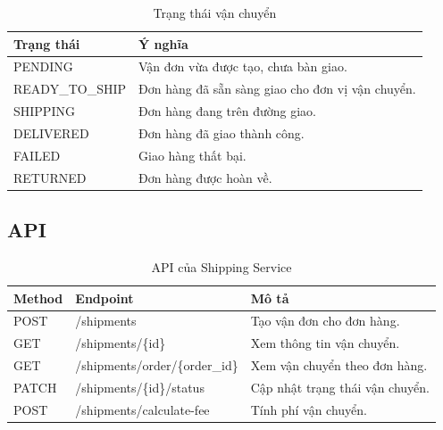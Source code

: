 \documentclass[../main.tex]{subfiles}
\begin{document}
\begin{table}[H]
    \centering
    \caption{Trạng thái vận chuyển}
    \label{tab:chapter2-shipping-status}
    \begin{tabular}{|p{}|p{}|}
        \hline
        \rowcolor{primary!35}
        \textbf{Trạng thái} & \textbf{Ý nghĩa} \\
        \hline
        PENDING & Vận đơn vừa được tạo, chưa bàn giao. \\
        \hline
        READY\_TO\_SHIP & Đơn hàng đã sẵn sàng giao cho đơn vị vận chuyển. \\
        \hline
        SHIPPING & Đơn hàng đang trên đường giao. \\
        \hline
        DELIVERED & Đơn hàng đã giao thành công. \\
        \hline
        FAILED & Giao hàng thất bại. \\
        \hline
        RETURNED & Đơn hàng được hoàn về. \\
        \hline
    \end{tabular}
\end{table}

\subsection{API}
\label{subsection:2.8.3}

\begin{table}[H]
    \centering
    \caption{API của Shipping Service}
    \label{tab:chapter2-shipping-api}
    \begin{tabular}{|p{}|p{}|p{}|}
        \hline
        \rowcolor{primary!35}
        \textbf{Method} & \textbf{Endpoint} & \textbf{Mô tả} \\
        \hline
        POST & /shipments & Tạo vận đơn cho đơn hàng. \\
        \hline
        GET & /shipments/\{id\} & Xem thông tin vận chuyển. \\
        \hline
        GET & /shipments/order/\{order\_id\} & Xem vận chuyển theo đơn hàng. \\
        \hline
        PATCH & /shipments/\{id\}/status & Cập nhật trạng thái vận chuyển. \\
        \hline
        POST & /shipments/calculate-fee & Tính phí vận chuyển. \\
        \hline
    \end{tabular}
\end{table}
\end{document}

